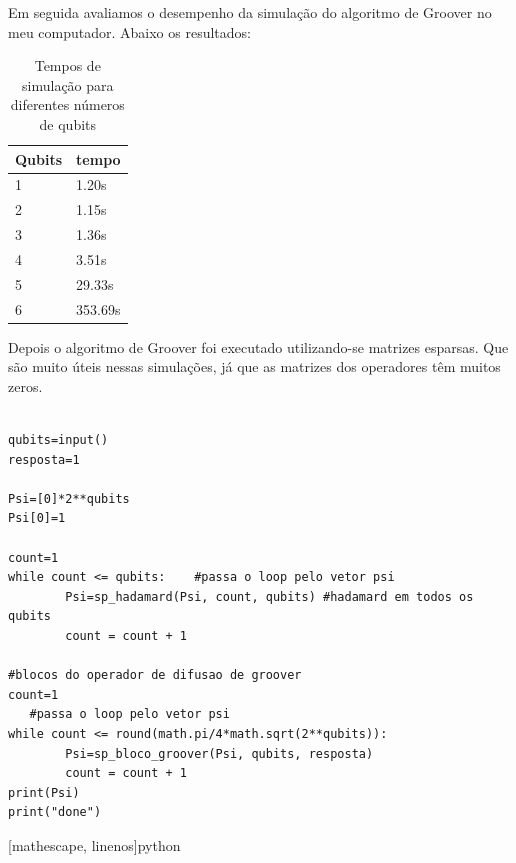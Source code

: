\documentclass[12pt,a4paper]{article}
\begin{document}
Em seguida avaliamos o desempenho da simulação do algoritmo de Groover no meu computador. Abaixo os resultados:

\begin{table}[htb]

\begin{adjustbox}{center}
\begin{tabular}{|l|l|}  
\hline
Qubits  & tempo \\ \hline
1  & 1.20s \\ \hline
2  &  1.15s\\ \hline
3  &   1.36s\\ \hline
4  &  3.51s\\ \hline
5  &  29.33s\\ \hline
6  &   353.69s\\ \hline

\end{tabular}
\end{adjustbox}
\caption{Tempos de simulação para diferentes números de qubits}
\end{table}


Depois o algoritmo de Groover foi executado utilizando-se matrizes esparsas. Que são muito úteis nessas simulações, já que as matrizes dos operadores têm muitos zeros.

\begin{verbatim}
    
qubits=input()
resposta=1

Psi=[0]*2**qubits
Psi[0]=1

count=1
while count <= qubits:    #passa o loop pelo vetor psi
        Psi=sp_hadamard(Psi, count, qubits) #hadamard em todos os qubits
        count = count + 1

#blocos do operador de difusao de groover
count=1
   #passa o loop pelo vetor psi
while count <= round(math.pi/4*math.sqrt(2**qubits)): 
        Psi=sp_bloco_groover(Psi, qubits, resposta)
        count = count + 1
print(Psi)
print("done")

\end{verbatim}[mathescape, linenos]{python}
\end{document}
